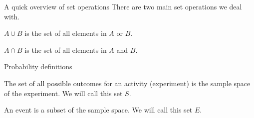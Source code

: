	\begin{namedframe}{A quick overview of set operations}
		There are two main set operations we deal with.
		\pause
		\begin{description}[<+->]
			\item[Set Union] $A \cup B$ is the set of all elements in $A$ \alert{or} $B$.
			\item[Set Intersection] $A \cap B$ is the set of all elements in $A$ \alert{and} $B$.
		\end{description}
	\end{namedframe}
	\begin{namedframe}{Probability definitions}
		\begin{description}[<+->]
			\item[Sample space] The set of all possible outcomes for an activity (experiment) is the sample space of the experiment. We will call this set $S$.
			\item[Event] An event is a subset of the sample space. We will call this set $E$.
		\end{description}
	\end{namedframe}
